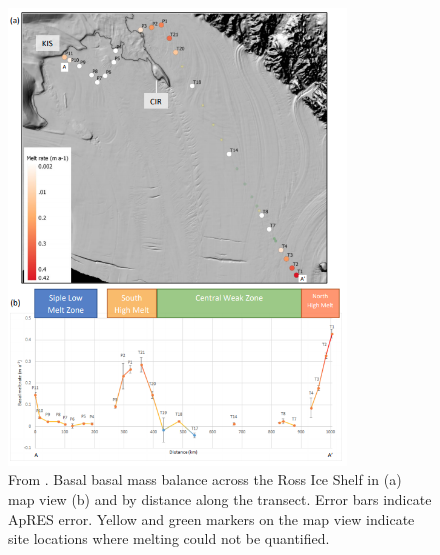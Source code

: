 \begin{figure}[!ht]
\centering
\includegraphics[width=0.8\textwidth]{chapters/3/RIS_melt.png}
\caption[Ross Ice Shelf melt]{From \cite{snodgrass2021melting}. Basal basal mass balance across the Ross Ice Shelf in (a) map view (b) and by distance along
the transect. Error bars indicate ApRES error. Yellow and green
markers on the map view indicate site locations where melting could not be quantified.  }
\label{fig:RIS_melt}
\end{figure}  


